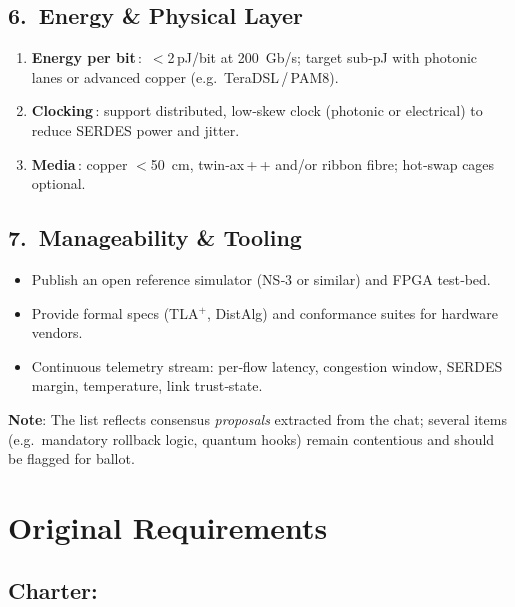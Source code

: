 \documentclass[HFT-main.tex]{subfiles}
\begin{document}
\subsection*{6.\ Energy \& Physical Layer}
\begin{enumerate}%
  \item \textbf{Energy per bit}\,: \,$<$2\,pJ/bit at 200 Gb/s; target sub‑pJ with photonic lanes or advanced copper (e.g.\ TeraDSL\,/\,PAM8).  
  \item \textbf{Clocking}\,: support distributed, low‑skew clock (photonic or electrical) to reduce SERDES power and jitter.  
  \item \textbf{Media}\,: copper $<$50 cm, twin‑ax\,+\,+ and/or ribbon fibre; hot‑swap cages optional.
\end{enumerate}

\subsection*{7.\ Manageability \& Tooling}
\begin{itemize}
  \item Publish an open reference simulator (NS‑3 or similar) and FPGA test‑bed.  
  \item Provide formal specs (TLA$^{+}$, DistAlg) and conformance suites for hardware vendors.  
  \item Continuous telemetry stream: per‑flow latency, congestion window, SERDES margin, temperature, link trust‑state.
\end{itemize}

\bigskip
\noindent\textbf{Note}: The list reflects consensus \emph{proposals} extracted from the chat; several items (e.g.\ mandatory rollback logic, quantum hooks) remain contentious and should be flagged for ballot.





\appendix

\section{Original Requirements}

%




\subsection{Charter:}
\end{document}
